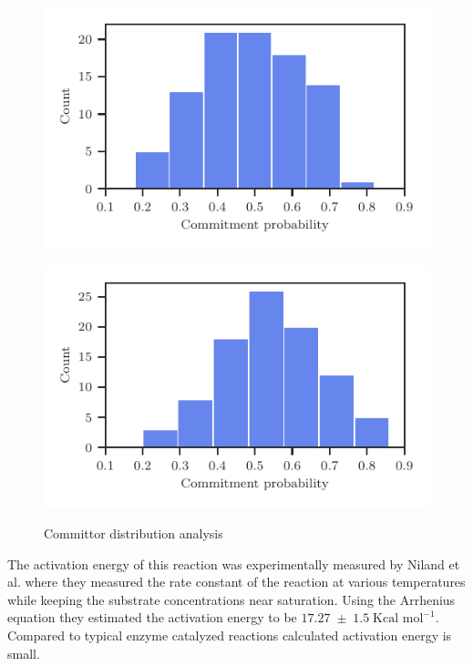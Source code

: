 \documentclass[journal=jpcbfk,manuscript=article,layout=twocolumn]{achemso}
\begin{document}
\begin{figure}[ht!]
\centering
\begin{minipage}[b]{0.45\linewidth}
\includegraphics[width=\textwidth]{figures/comm-60-mat2a-nocons.pdf}
\label{fig:minipage1}
\end{minipage}
\quad
\begin{minipage}[b]{0.45\linewidth}
\includegraphics[width=\textwidth]{figures/comm-60-mat2a.pdf}
\label{fig:minipage2}
\end{minipage}
\caption{Committor distribution analysis}
\end{figure}

The activation energy of this reaction was experimentally measured by 
Niland et al. \cite{Niland21Biochem60p791} where they measured the rate constant of the reaction 
at various temperatures while keeping the substrate concentrations near saturation.
Using the Arrhenius equation they estimated the activation energy to be 
$17.27\;\pm\;1.5\;\text{Kcal mol}^{-1}$. Compared to typical enzyme catalyzed 
reactions calculated activation energy is small.  
\end{document}
